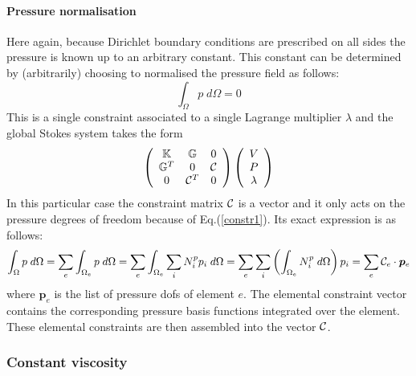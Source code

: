 \paragraph{Pressure normalisation} Here again, because Dirichlet boundary conditions are prescribed on all sides the 
pressure is known up to an arbitrary constant. This constant can be determined by (arbitrarily) choosing 
to normalised the pressure field as follows:
\begin{equation}
\int_\Omega p \; d\Omega = 0 \label{constr1}
\end{equation}
This is a single constraint associated to a single Lagrange multiplier $\lambda$ and the global Stokes system takes the form 
\[
\left(
\begin{array}{ccc}
{\mathbb{K}} & {\mathbb{G}} & 0 \\
{\mathbb{G}}^T & 0 & {\cal C}\\
0 & {\cal C}^T & 0
\end{array}
\right)
\left(
\begin{array}{c}
V \\ P \\ \lambda
\end{array}
\right)
\]
In this particular case the constraint matrix ${\cal C}$ is a vector and it only acts on the pressure degrees of freedom because
of Eq.(\ref{constr1}). Its exact expression is as follows:
\[
\int_\Omega p \; d\Omega = \sum_e \int_{\Omega_e}  p \; d\Omega 
=\sum_e \int_{\Omega_e}  \sum_{i} N^p_i p_i \; d\Omega  
=\sum_e \sum_i \left( \int_{\Omega_e}  N^p_i \; d\Omega \right)  p_i 
=\sum_e {\cal C}_e \cdot {\bm p}_e
\] 
where ${\bm p}_e$ is the list of pressure dofs of element $e$. The elemental constraint vector contains the 
corresponding pressure basis functions integrated over the element. These elemental constraints are then 
assembled into the vector ${\cal C}$.

\subsubsection*{Constant viscosity}

